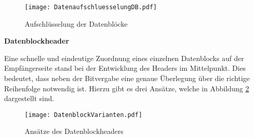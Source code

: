 \begin{figure}[H]
	\centering
	\texttt{[image: DatenaufschluesselungDB.pdf]}
	\caption{Aufschlüsselung der Datenblöcke}
  \label{fig:DatenaufschluesselungDB}
\end{figure}

\textbf{Datenblockheader}

Eine schnelle und eindeutige Zuordnung eines einzelnen Datenblocks auf der
Empfängerseite stand bei der Entwicklung des Headers im Mittelpunkt.
Dies bedeutet, dass neben der Bitvergabe eine genaue Überlegung über die
richtige Reihenfolge notwendig ist. Hierzu gibt es drei Ansätze, welche in
Abbildung \ref{fig:DatenblockVarianten} dargestellt sind.

\begin{figure}[H]
	\centering
	\texttt{[image: DatenblockVarianten.pdf]}
	\caption{Ansätze des Datenblockheaders}
  \label{fig:DatenblockVarianten}
\end{figure}

